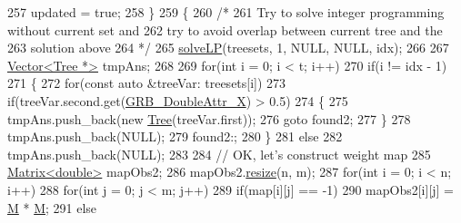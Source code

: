 \begin{DoxyCode}
257                         updated = \textcolor{keyword}{true};
258                 \}
259                 \{
260                     \textcolor{comment}{/*}
261 \textcolor{comment}{                        Try to solve integer programming without current set and}
262 \textcolor{comment}{                        try to avoid overlap between current tree and the}
263 \textcolor{comment}{                        solution above}
264 \textcolor{comment}{                    */}
265                     \hyperlink{classColumnGenSolve_aadb23efa531a3eb68651ba11f4d36c81}{solveLP}(treesets, 1, NULL, NULL, idx);
266                     
267                     \hyperlink{classVector}{Vector<Tree *>} tmpAns;
268                     
269                     \textcolor{keywordflow}{for}(\textcolor{keywordtype}{int} i = 0; i < t; i++)
270                         \textcolor{keywordflow}{if}(i != idx - 1)
271                         \{
272                             \textcolor{keywordflow}{for}(\textcolor{keyword}{const} \textcolor{keyword}{auto} &treeVar: treesets[i])
273                                 \textcolor{keywordflow}{if}(treeVar.second.get(\hyperlink{gurobi__c_09_09_8h_a2f43cc28447ce1778973a1f7961e8180a88afa2b5caf4dd5e8b44785752f6940a}{GRB\_DoubleAttr\_X}) > 0.5)
274                                 \{
275                                     tmpAns.push\_back(\textcolor{keyword}{new} \hyperlink{classTree}{Tree}(treeVar.first));
276                                     \textcolor{keywordflow}{goto} found2;
277                                 \}
278                             tmpAns.push\_back(NULL);
279                             found2:;
280                         \}
281                         \textcolor{keywordflow}{else}
282                             tmpAns.push\_back(NULL);
283                     
284                     \textcolor{comment}{// OK, let's construct weight map}
285                     \hyperlink{classMatrix}{Matrix<double>} mapObs2;
286                     mapObs2.\hyperlink{classMatrix_a15ce96c8af4c7a982c2c10b96f29cea1}{resize}(n, m);
287                     \textcolor{keywordflow}{for}(\textcolor{keywordtype}{int} i = 0; i < n; i++)
288                         \textcolor{keywordflow}{for}(\textcolor{keywordtype}{int} j = 0; j < m; j++)
289                             \textcolor{keywordflow}{if}(map[i][j] == -1)
290                                 mapObs2[i][j] = \hyperlink{classColumnGenSolve_ac5abb4d6dfd291b01af6ea006b5f9f5d}{M} * \hyperlink{classColumnGenSolve_ac5abb4d6dfd291b01af6ea006b5f9f5d}{M};
291                             \textcolor{keywordflow}{else}

\end{DoxyCode}
